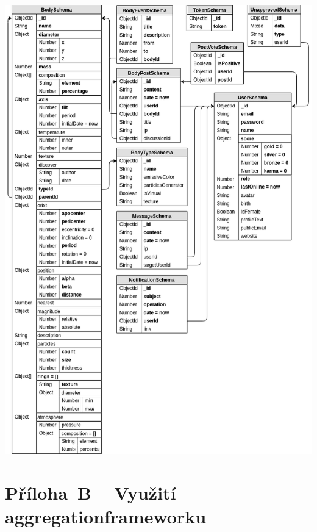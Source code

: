 \documentclass[a4paper,12pt]{article}
\begin{document}
\vspace{-0.5cm}\hspace{-1cm}
\includegraphics[width=500pt]{Images/DB.png}

\clearpage {}\label{prilohaB} 

\section*{Příloha~B --  Využití aggregation\newline frameworku}



\clearpage {}\label{prilohaC} 
\end{document}
